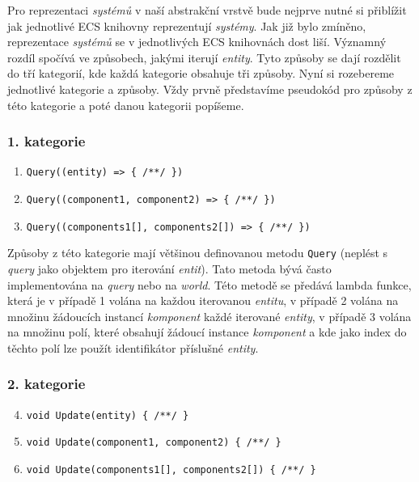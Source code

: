 Pro reprezentaci \textit{systémů} v naší abstrakční vrstvě bude nejprve nutné si přiblížit jak jednotlivé ECS knihovny reprezentují \textit{systémy}. Jak již bylo zmíněno, reprezentace \textit{systémů} se v jednotlivých ECS knihovnách dost liší. Významný rozdíl spočívá ve způsobech, jakými iterují \textit{entity}. Tyto způsoby se dají rozdělit do tří kategorií, kde každá kategorie obsahuje tři způsoby. Nyní si rozebereme jednotlivé kategorie a způsoby. Vždy prvně představíme pseudokód pro způsoby z této kategorie a poté danou kategorii popíšeme.

\subsubsection{1. kategorie}

\begin{enumerate}
    \item \verb|Query((entity) => { /**/ })|
    \item \verb|Query((component1, component2) => { /**/ })|
    \item \verb|Query((components1[], components2[]) => { /**/ })|
\end{enumerate}

Způsoby z této kategorie mají většinou definovanou metodu \verb|Query| (neplést s \textit{query} jako objektem pro iterování \textit{entit}). Tato metoda bývá často implementována na \textit{query} nebo na \textit{world}. Této metodě se předává lambda funkce, která je v případě 1 volána na každou iterovanou \textit{entitu}, v případě 2 volána na množinu žádoucích instancí \textit{komponent} každé iterované \textit{entity}, v případě 3 volána na množinu polí, které obsahují žádoucí instance \textit{komponent} a kde jako index do těchto polí lze použít identifikátor příslušné \textit{entity}.

\subsubsection{2. kategorie}

\begin{enumerate}
    \setcounter{enumi}{3}
    \item \verb|void Update(entity) { /**/ }|
    \item \verb|void Update(component1, component2) { /**/ }|
    \item \verb|void Update(components1[], components2[]) { /**/ }|
\end{enumerate}

